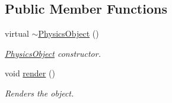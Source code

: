 \subsection*{Public Member Functions}
\begin{DoxyCompactItemize}
\item 
virtual \hyperlink{class_physics_object_ade6588d8622cff10e979118e0f8a076e}{$\sim$\+Physics\+Object} ()\hypertarget{class_physics_object_ade6588d8622cff10e979118e0f8a076e}{}\label{class_physics_object_ade6588d8622cff10e979118e0f8a076e}

\begin{DoxyCompactList}\small\item\em \hyperlink{class_physics_object}{Physics\+Object} constructor. \end{DoxyCompactList}\item 
void \hyperlink{class_physics_object_a37fcb312275149e32e30ade97c30ff8d}{render} ()\hypertarget{class_physics_object_a37fcb312275149e32e30ade97c30ff8d}{}\label{class_physics_object_a37fcb312275149e32e30ade97c30ff8d}

\begin{DoxyCompactList}\small\item\em Renders the object. \end{DoxyCompactList}\end{DoxyCompactItemize}
